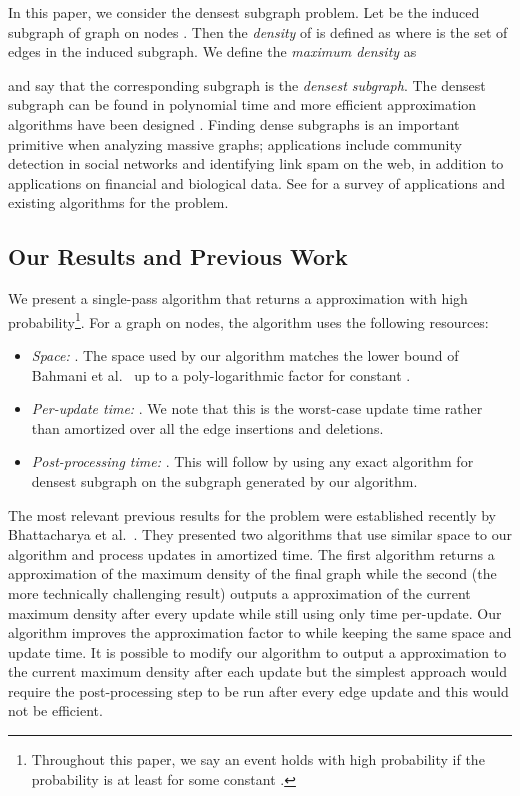 \documentclass[11pt]{article}
\begin{document}
In this paper, we consider the densest subgraph problem.
Let  be the induced subgraph of graph  on nodes . Then the \emph{density} of  is defined as  where  is the set of edges in the induced subgraph. We define the \emph{maximum density} as 

and say that the corresponding subgraph is the \emph{densest subgraph}. The densest subgraph can be found in polynomial time 
\cite{GalloGT89,Goldberg84,Charikar00,KhullerS09} and more efficient approximation algorithms have been designed \cite{Charikar00}. Finding dense subgraphs is an important primitive when analyzing massive graphs; applications include community detection in social networks and identifying link spam on the web, in addition to applications on financial and biological data.  See \cite{densesurvey} for a survey of applications and existing algorithms for the problem.

\subsection{Our Results and Previous Work}

We present a single-pass algorithm that returns a  approximation with high probability\footnote{Throughout this paper, we say an event holds with high probability if the probability is at least  for some constant .}. For a graph on  nodes, the algorithm uses the following resources:
\begin{itemize} 
\item {\em Space:} . The space used by our algorithm matches the lower bound of Bahmani  et al.~\cite{BahmaniKV12} up to a poly-logarithmic factor for constant . 
\item {\em Per-update time:} . We note that this is the worst-case update time rather than amortized over all the edge insertions and deletions. 
\item {\em Post-processing time:} . This will follow by using any exact algorithm for densest subgraph \cite{GalloGT89,Goldberg84,Charikar00} on the subgraph  generated  by our algorithm.
\end{itemize}  

The most relevant previous results for the problem were established recently by Bhattacharya et al.~\cite{BhattacharyaHNT15}. They presented two algorithms that use similar space to our algorithm and process updates in  amortized time. The first algorithm returns a  approximation of the maximum density of the final graph while the second (the more technically challenging result) outputs a  approximation of the current maximum density after every update while still using only  time per-update. 
Our algorithm improves the approximation factor to  while keeping the same space and update time. It is possible to modify our algorithm to output a  approximation to the current maximum density after each update but the simplest approach would require the post-processing step  to be run after every edge update and this  would not be efficient.
\end{document}
